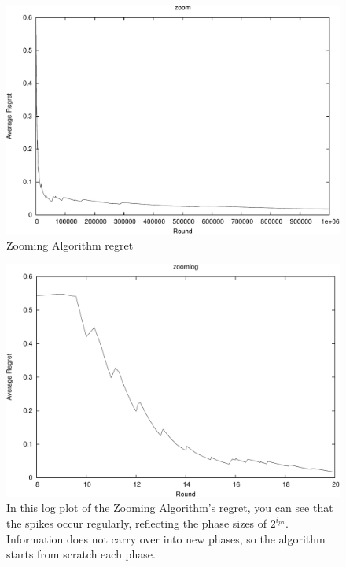 \documentclass{article}
\begin{document}
\begin{figure}[h!]
  \begin{center}
     \includegraphics[width=\figwidth]{images/zoom-crop.pdf}
     \caption{Zooming Algorithm regret}
     \label{fig:zoom}
  \end{center}
\end{figure}

\begin{figure}[h!]
  \begin{center}
     \includegraphics[width=\figwidth]{images/zoomlog-crop.pdf}
     \caption{In this log plot of the Zooming Algorithm's regret, you
     can see that the spikes occur regularly, reflecting the phase
     sizes of $2^{i_{ph}}$. Information does not carry over into new
     phases, so the algorithm starts from scratch each phase.}
     \label{fig:zoomlog}
  \end{center}
\end{figure}
\end{document}
